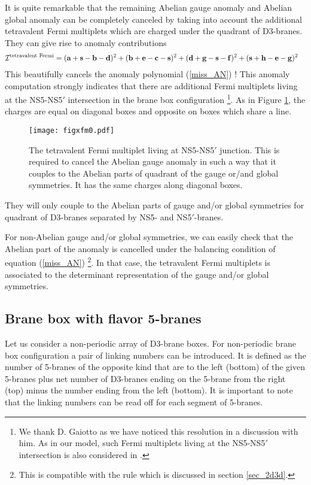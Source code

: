 \documentclass{article}
\numberwithin{equation}{section}
\begin{document}
It is quite remarkable that 
the remaining Abelian gauge anomaly 
and Abelian global anomaly
can be completely canceled by 
taking into account the additional tetravalent Fermi multiplets which are charged under the quadrant of D3-branes.  
They can give rise to anomaly contributions 
\begin{align}
\label{xfm_AN}
\mathcal{I}^{\textrm{tetravalent Fermi}}
&=
({\bf a}+{\bf s}-{\bf b}-{\bf d})^{2}
+({\bf b}+{\bf e}-{\bf c}-{\bf s})^{2}
+({\bf d}+{\bf g}-{\bf s}-{\bf f})^{2}
+({\bf s}+{\bf h}-{\bf e}-{\bf g})^{2}
\end{align}
This beautifully cancels the anomaly polynomial (\ref{miss_AN}) !
This anomaly computation strongly indicates that 
there are additional Fermi multiplets living at the NS5-NS5$'$ intersection in the brane box configuration 
\footnote{
We thank D. Gaiotto as we have noticed this resolution in a discussion with him. 
As in our model, such Fermi multiplets living at the NS5-NS5$'$ intersection is also considered 
in \cite{Costello:2018fnz}. 
}. 
As in Figure \ref{figxfm0}, the charges are equal on diagonal boxes and opposite on boxes which share a line.
\begin{figure}
\begin{center}
\texttt{[image: figxfm0.pdf]}
\vspace*{0.5cm}
\caption{
The tetravalent Fermi multiplet living at NS5-NS5$'$ junction. 
This is required to cancel the Abelian gauge anomaly in such a way that 
it couples to the Abelian parts of quadrant of the gauge or/and global symmetries. 
It has the same charges along diagonal boxes. 
}
\label{figxfm0}
\end{center}
\end{figure}
They will only couple to the Abelian parts of gauge and/or global symmetries for quadrant of D3-branes 
separated by NS5- and NS5$'$-branes. 

For non-Abelian gauge and/or global symmetries, 
we can easily check that 
the Abelian part of the anomaly is cancelled under the balancing condition of equation (\ref{miss_AN})
\footnote{This is compatible with the rule which is discussed in section \ref{sec_2d3d}.}. 
In that case, the tetravalent Fermi multiplets is associated to the determinant representation of 
the gauge and/or global symmetries. 









\subsection{Brane box with flavor 5-branes}
\label{sec_d3box_d5}
Let us consider a non-periodic array of D3-brane boxes. 
For non-periodic brane box configuration 
a pair of linking numbers can be introduced. 
It is defined as the number of 5-branes of the opposite kind that are to the left (bottom) of the given 5-branes plus 
net number of D3-branes ending on the 5-brane from the right (top) minus the number ending from the left (bottom). 
It is important to note that 
the linking numbers can be read off for each segment of 5-branes. 
\end{document}
